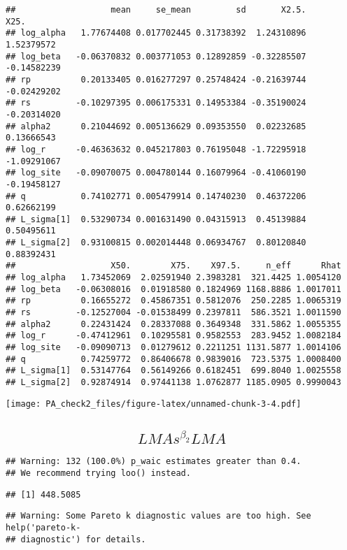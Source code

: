 \documentclass[12pt,]{article}
\begin{document}
\begin{verbatim}
##                   mean     se_mean         sd       X2.5.        X25.
## log_alpha   1.77674408 0.017702445 0.31738392  1.24310896  1.52379572
## log_beta   -0.06370832 0.003771053 0.12892859 -0.32285507 -0.14582239
## rp          0.20133405 0.016277297 0.25748424 -0.21639744 -0.02429202
## rs         -0.10297395 0.006175331 0.14953384 -0.35190024 -0.20314020
## alpha2      0.21044692 0.005136629 0.09353550  0.02232685  0.13666543
## log_r      -0.46363632 0.045217803 0.76195048 -1.72295918 -1.09291067
## log_site   -0.09070075 0.004780144 0.16079964 -0.41060190 -0.19458127
## q           0.74102771 0.005479914 0.14740230  0.46372206  0.62662199
## L_sigma[1]  0.53290734 0.001631490 0.04315913  0.45139884  0.50495611
## L_sigma[2]  0.93100815 0.002014448 0.06934767  0.80120840  0.88392431
##                   X50.        X75.    X97.5.     n_eff      Rhat
## log_alpha   1.73452069  2.02591940 2.3983281  321.4425 1.0054120
## log_beta   -0.06308016  0.01918580 0.1824969 1168.8886 1.0017011
## rp          0.16655272  0.45867351 0.5812076  250.2285 1.0065319
## rs         -0.12527004 -0.01538499 0.2397811  586.3521 1.0011590
## alpha2      0.22431424  0.28337088 0.3649348  331.5862 1.0055355
## log_r      -0.47412961  0.10295581 0.9582553  283.9452 1.0082184
## log_site   -0.09090713  0.01279612 0.2211251 1131.5877 1.0014106
## q           0.74259772  0.86406678 0.9839016  723.5375 1.0008400
## L_sigma[1]  0.53147764  0.56149266 0.6182451  699.8040 1.0025558
## L_sigma[2]  0.92874914  0.97441138 1.0762877 1185.0905 0.9990043
\end{verbatim}

\texttt{[image: PA\_check2\_files/figure-latex/unnamed-chunk-3-4.pdf]}

\newpage

\subsection{\texorpdfstring{\[LMAs^{\beta_2}LMA\]}{LMAs\^{}\{\textbackslash{}beta\_2\}LMA}}\label{lmasbeta_2lma}

\begin{verbatim}
## Warning: 132 (100.0%) p_waic estimates greater than 0.4.
## We recommend trying loo() instead.
\end{verbatim}

\begin{verbatim}
## [1] 448.5085
\end{verbatim}

\begin{verbatim}
## Warning: Some Pareto k diagnostic values are too high. See help('pareto-k-
## diagnostic') for details.
\end{verbatim}
\end{document}

